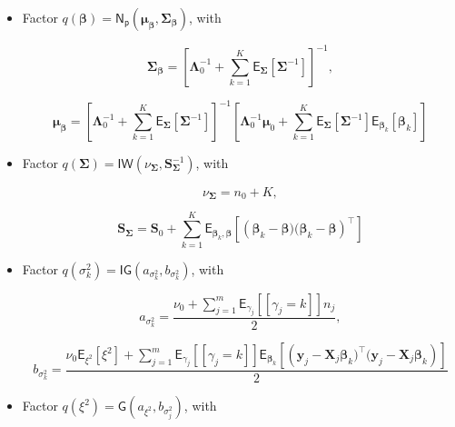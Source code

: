 \begin{itemize}
\item Factor $q(\bm{\beta})=\mathsf{N_p}(\bm{\mu}_{\bm{\beta}},\bm{\Sigma}_{\bm{\beta}})$, with

\begin{equation}
\label{CHLRM_CAVI_Sigma_Beta}
\bm{\Sigma}_{\bm{\beta}} = \left[\bm{\Lambda}_0^{-1}   + \sum_{k=1}^{K}\mathsf{E}_{\bm{\Sigma}}\left[\bm{\Sigma}^{-1}\right]  \right] ^{-1},
\end{equation}

\begin{equation}
\label{CHLRM_CAVI_Mu_Beta}
\bm{\mu}_{\bm{\beta}}= \left[\bm{\Lambda}_0^{-1}   + \sum_{k=1}^{K}\mathsf{E}_{\bm{\Sigma}}\left[\bm{\Sigma}^{-1}\right]  \right]^{-1}\left[\bm{\Lambda}_0^{-1} \bm{\mu}_0 + \sum_{k=1}^{K}\mathsf{E}_{\bm{\Sigma}}\left[\bm{\Sigma}^{-1}\right] \mathsf{E}_{\bm{\beta}_k}\left[\bm{\beta}_k \right]\right]
\end{equation}

\item Factor $q(\bm{\Sigma})=\mathsf{IW}(\nu_{\bm{\Sigma}},\bm{S}_{\bm{\Sigma}}^{-1})$, with

\begin{equation}
\label{CHLRM_CAVI_nu_Sigma}
\nu_{\bm{\Sigma}} = n_0+K,
\end{equation}

\begin{equation}
\label{CHLRM_CAVI_S_Sigma}
\bm{S}_{\bm{\Sigma}}=  \bm{S}_0 + \sum_{k=1}^{K} \mathsf{E}_{\bm{\beta}_k,\bm{\beta}}\left[\left(\bm{\beta}_k - \bm{\beta})(\bm{\beta}_k - \bm{\beta}\right)^\top\right]
\end{equation}

\item Factor $q(\sigma_k^2)=\mathsf{IG}(a_{\sigma_k^2},b_{\sigma_k^2})$, with

\begin{equation}
\label{CHLRM_CAVI_a_sigma2k}
a_{\sigma_k^2}= \frac{\nu_0 + \sum_{j=1}^{m}\mathsf{E}_{\gamma_j}\left[[\gamma_j=k]\right]n_j}{2},
\end{equation}

\begin{equation}
\label{CHLRM_CAVI_b_sigma2k}
b_{\sigma_k^2}= \frac{ \nu_0 \mathsf{E}_{\xi^2}\left[\xi^2\right] +  \sum_{j=1}^{m}\mathsf{E}_{\gamma_j}\left[[\gamma_j=k]\right]\mathsf{E}_{\bm{\beta}_k}\left[\left(\bm{y}_{j} - \bm{X}_{j} \bm{\beta}_k)^\top(\bm{y}_{j} - \bm{X}_{j} \bm{\beta}_k\right)\right]}{2}
\end{equation}

\item Factor $q(\xi^2)=\mathsf{G}(a_{\xi^2},b_{\sigma_j^2})$, with


\end{itemize}
